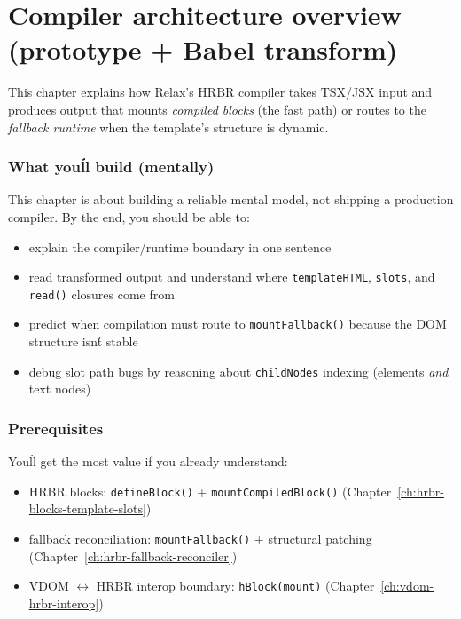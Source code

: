 \chapter{Compiler architecture overview (prototype + Babel transform)}
\label{ch:compiler-architecture}

This chapter explains how Relax's HRBR compiler takes TSX/JSX input and produces output that mounts \emph{compiled blocks} (the fast path) or routes to the \emph{fallback runtime} when the template's structure is dynamic.

\subsection*{What you\'ll build (mentally)}

This chapter is about building a reliable mental model, not shipping a production compiler.
By the end, you should be able to:

\begin{itemize}
\item explain the compiler/runtime boundary in one sentence
\item read transformed output and understand where \texttt{templateHTML}, \texttt{slots}, and \texttt{read()} closures come from
\item predict when compilation must route to \texttt{mountFallback()} because the DOM structure isn\'t stable
\item debug slot path bugs by reasoning about \texttt{childNodes} indexing (elements \emph{and} text nodes)
\end{itemize}

\subsection*{Prerequisites}

You\'ll get the most value if you already understand:

\begin{itemize}
\item HRBR blocks: \texttt{defineBlock()} + \texttt{mountCompiledBlock()} (Chapter~\ref{ch:hrbr-blocks-template-slots})
\item fallback reconciliation: \texttt{mountFallback()} + structural patching (Chapter~\ref{ch:hrbr-fallback-reconciler})
\item VDOM \(\leftrightarrow\) HRBR interop boundary: \texttt{hBlock(mount)} (Chapter~\ref{ch:vdom-hrbr-interop})
\end{itemize}

